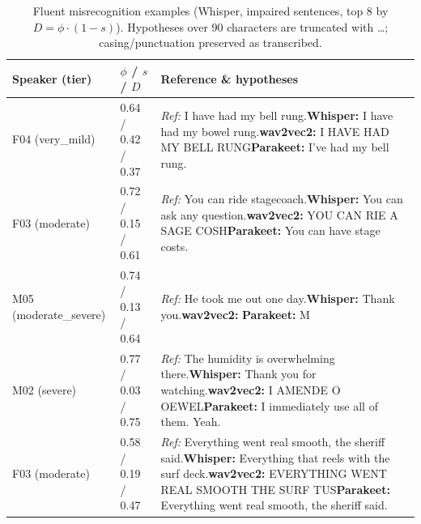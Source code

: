 \begin{table}[t]
\caption{Fluent misrecognition examples (Whisper, impaired sentences, top 8 by $D=\phi\cdot(1-s)$). Hypotheses over 90 characters are truncated with \ldots; casing/punctuation preserved as transcribed.}
\label{tab:qualitative}
\footnotesize
\begin{tabular}{@{}p{}p{}p{}@{}}
\toprule
\textbf{Speaker (tier)} & \textbf{$\phi$ / $s$ / $D$} & \textbf{Reference \& hypotheses} \\
\midrule
F04 (very_mild) & 0.64 / 0.42 / 0.37 & \textit{Ref:} I have had my bell rung.\newline \textbf{Whisper:} I have had my bowel rung.\newline \textbf{wav2vec2:} I HAVE HAD MY BELL RUNG\newline \textbf{Parakeet:} I've had my bell rung. \\
\addlinespace
F03 (moderate) & 0.72 / 0.15 / 0.61 & \textit{Ref:} You can ride stagecoach.\newline \textbf{Whisper:} You can ask any question.\newline \textbf{wav2vec2:} YOU CAN RIE A SAGE COSH\newline \textbf{Parakeet:} You can have stage costs. \\
\addlinespace
M05 (moderate_severe) & 0.74 / 0.13 / 0.64 & \textit{Ref:} He took me out one day.\newline \textbf{Whisper:} Thank you.\newline \textbf{wav2vec2:} \newline \textbf{Parakeet:} M \\
\addlinespace
M02 (severe) & 0.77 / 0.03 / 0.75 & \textit{Ref:} The humidity is overwhelming there.\newline \textbf{Whisper:} Thank you for watching.\newline \textbf{wav2vec2:} I AMENDE O OEWEL\newline \textbf{Parakeet:} I immediately use all of them. Yeah. \\
\addlinespace
F03 (moderate) & 0.58 / 0.19 / 0.47 & \textit{Ref:} Everything went real smooth, the sheriff said.\newline \textbf{Whisper:} Everything that reels with the surf deck.\newline \textbf{wav2vec2:} EVERYTHING WENT REAL SMOOTH THE SURF TUS\newline \textbf{Parakeet:} Everything went real smooth, the sheriff said. \\

\end{tabular}
\end{table}
